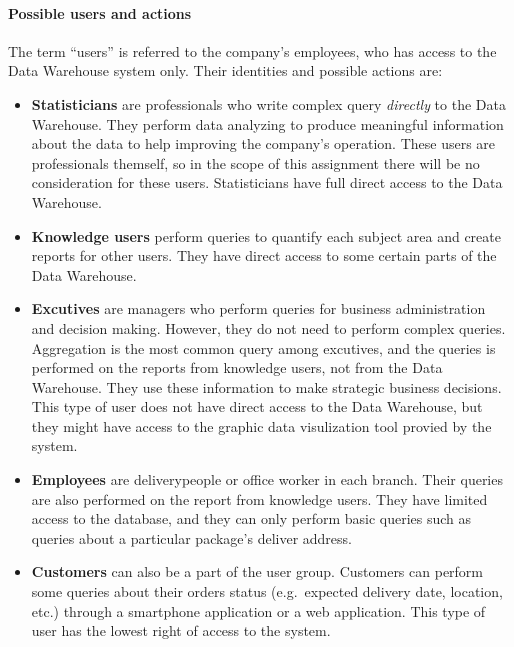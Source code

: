 \documentclass[a4paper,11pt]{article}
\begin{document}
\paragraph{Possible users and actions} The term ``users'' is referred to the company's employees, who has access to the Data Warehouse system only. Their identities and possible actions are:
\begin{itemize}
    \setlength{\itemsep}{0cm}
    \setlength{\parskip}{0cm}
    \item \textbf{Statisticians} are professionals who write complex query \emph{directly} to the Data Warehouse. They perform data analyzing to produce meaningful information about the data to help improving the company's operation. These users are professionals themself, so in the scope of this assignment there will be no consideration for these users. Statisticians have full direct access to the Data Warehouse.
    \item \textbf{Knowledge users} perform queries to quantify each subject area and create reports for other users. They have direct access to some certain parts of the Data Warehouse.
    \item \textbf{Excutives} are managers who perform queries for business administration and decision making. However, they do not need to perform complex queries. Aggregation is the most common query among excutives, and the queries is performed on the reports from knowledge users, not from the Data Warehouse. They use these information to make strategic business decisions. This type of user does not have direct access to the Data Warehouse, but they might have access to the graphic data visulization tool provied by the system.
    \item \textbf{Employees} are deliverypeople or office worker in each branch. Their queries are also performed on the report from knowledge users. They have limited access to the database, and they can only perform basic queries such as queries about a particular package's deliver address. 
    \item \textbf{Customers} can also be a part of the user group. Customers can perform some queries about their orders status (e.g.\ expected delivery date, location, etc.) through a smartphone application or a web application. This type of user has the lowest right of access to the system.
\end{itemize}
\end{document}

